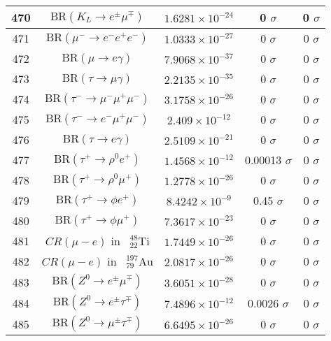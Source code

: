 \begin{longtable}{|c|c|c|c|c|}
470 &	 $\mathrm{BR}(K_L\to e^\pm\mu^\mp)$ &	 $1.6281\times 10^{-24}$ &	 0 $ \sigma$ &	 0 $ \sigma$ \\ \hline
471 &	 $\mathrm{BR}(\mu^-\to e^-e^+e^-)$ &	 $1.0333\times 10^{-27}$ &	 0 $ \sigma$ &	 0 $ \sigma$ \\ \hline
472 &	 $\mathrm{BR}(\mu\to e\gamma)$ &	 $7.9068\times 10^{-37}$ &	 0 $ \sigma$ &	 0 $ \sigma$ \\ \hline
473 &	 $\mathrm{BR}(\tau\to \mu\gamma)$ &	 $2.2135\times 10^{-35}$ &	 0 $ \sigma$ &	 0 $ \sigma$ \\ \hline
474 &	 $\mathrm{BR}(\tau^-\to \mu^-\mu^+\mu^-)$ &	 $3.1758\times 10^{-26}$ &	 0 $ \sigma$ &	 0 $ \sigma$ \\ \hline
475 &	 $\mathrm{BR}(\tau^-\to e^-\mu^+\mu^-)$ &	 $2.409\times 10^{-12}$ &	 0 $ \sigma$ &	 0 $ \sigma$ \\ \hline
476 &	 $\mathrm{BR}(\tau\to e\gamma)$ &	 $2.5109\times 10^{-21}$ &	 0 $ \sigma$ &	 0 $ \sigma$ \\ \hline
477 &	 $\mathrm{BR}(\tau^+\to \rho^0 e^+)$ &	 $1.4568\times 10^{-12}$ &	 \cellcolor{red!0}0.00013 $ \sigma$ &	 0 $ \sigma$ \\ \hline
478 &	 $\mathrm{BR}(\tau^+\to \rho^0\mu^+)$ &	 $1.2778\times 10^{-26}$ &	 0 $ \sigma$ &	 0 $ \sigma$ \\ \hline
479 &	 $\mathrm{BR}(\tau^+\to \phi e^+)$ &	 $8.4242\times 10^{-9}$ &	 \cellcolor{red!22}0.45 $ \sigma$ &	 0 $ \sigma$ \\ \hline
480 &	 $\mathrm{BR}(\tau^+\to \phi\mu^+)$ &	 $7.3617\times 10^{-23}$ &	 0 $ \sigma$ &	 0 $ \sigma$ \\ \hline
481 &	 $CR(\mu - e)$ in $\phantom k^{48}_{22} \mathrm{Ti}$ &	 $1.7449\times 10^{-26}$ &	 0 $ \sigma$ &	 0 $ \sigma$ \\ \hline
482 &	 $CR(\mu - e)$ in $\phantom k^{197}_{79} \mathrm{Au}$ &	 $2.0817\times 10^{-26}$ &	 0 $ \sigma$ &	 0 $ \sigma$ \\ \hline
483 &	 $\mathrm{BR}(Z^0\to  e^\pm\mu^\mp)$ &	 $3.6051\times 10^{-28}$ &	 0 $ \sigma$ &	 0 $ \sigma$ \\ \hline
484 &	 $\mathrm{BR}(Z^0\to  e^\pm\tau^\mp)$ &	 $7.4896\times 10^{-12}$ &	 \cellcolor{red!0}0.0026 $ \sigma$ &	 0 $ \sigma$ \\ \hline
485 &	 $\mathrm{BR}(Z^0\to \mu^\pm\tau^\mp)$ &	 $6.6495\times 10^{-26}$ &	 0 $ \sigma$ &	 0 $ \sigma$ \\ \hline
\end{longtable}